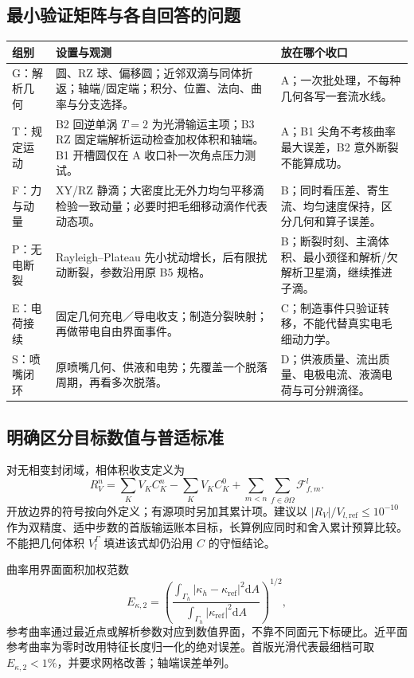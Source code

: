 \documentclass[11pt,a4paper]{article}
\newcommand{\dd}{\mathrm{d}}
\begin{document}
\subsection{最小验证矩阵与各自回答的问题}
\begin{longtable}{L{26mm}L{72mm}L{47mm}}
\toprule 组别 & 设置与观测 & 放在哪个收口\\\midrule\endhead
G：解析几何 & 圆、RZ 球、偏移圆；近邻双滴与同体折返；轴端/固定端；积分、位置、法向、曲率与分支选择。 & A；一次批处理，不每种几何各写一套流水线。\\
T：规定运动 & B2 回逆单涡 $T=2$ 为光滑输运主项；B3 RZ 固定端解析运动检查加权体积和轴端。B1 开槽圆仅在 A 收口补一次角点压力测试。 & A；B1 尖角不考核曲率最大误差，B2 意外断裂不能算成功。\\
F：力与动量 & XY/RZ 静滴；大密度比无外力均匀平移滴检验一致动量；必要时把毛细移动滴作代表动态项。 & B；同时看压差、寄生流、均匀速度保持，区分几何和算子误差。\\
P：无电断裂 & Rayleigh--Plateau 先小扰动增长，后有限扰动断裂，参数沿用原 B5 规格。 & B；断裂时刻、主滴体积、最小颈径和解析/欠解析卫星滴，继续推进子滴。\\
E：电荷接续 & 固定几何充电／导电收支；制造分裂映射；再做带电自由界面事件。 & C；制造事件只验证转移，不能代替真实电毛细动力学。\\
S：喷嘴闭环 & 原喷嘴几何、供液和电势；先覆盖一个脱落周期，再看多次脱落。 & D；供液质量、流出质量、电极电流、液滴电荷与可分辨滴径。\\\bottomrule
\end{longtable}

\subsection{明确区分目标数值与普适标准}
对无相变封闭域，相体积收支定义为
\begin{equation}
 R_V^n=\sum_KV_KC_K^n-\sum_KV_KC_K^0
             +\sum_{m<n}\sum_{f\in\partial\Omega}\mathcal F_{f,m}^l.
\end{equation}
开放边界的符号按向外定义；有源项时另加其累计项。建议以 $|R_V|/V_{l,\mathrm{ref}}\le10^{-10}$ 作为双精度、适中步数的首版输运账本目标，长算例应同时和舍入累计预算比较。不能把几何体积 $V_l^\Gamma$ 填进该式却仍沿用 $C$ 的守恒结论。

曲率用界面面积加权范数
\begin{equation}
 E_{\kappa,2}=\left(\frac{\int_{\Gamma_h}|\kappa_h-\kappa_{\mathrm{ref}}|^2\dd A}
 {\int_{\Gamma_h}|\kappa_{\mathrm{ref}}|^2\dd A}\right)^{1/2},
\end{equation}
参考曲率通过最近点或解析参数对应到数值界面，不靠不同面元下标硬比。近平面参考曲率为零时改用特征长度归一化的绝对误差。首版光滑代表最细档可取 $E_{\kappa,2}<1\%$，并要求网格改善；轴端误差单列。
\end{document}
